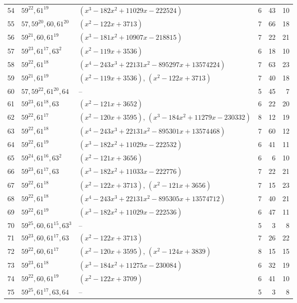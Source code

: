 \documentclass[11pt]{article}
\theoremstyle{definition}
\begin{document}
{\begin{longtable}{rlp{6.2cm}rrr}
54 & $59^{22}, 61^{19}$ & $(x^{3} - 182x^{2} + 11029x - 222524)$ & 6 & 43 & 10 \\
55 & $57, 59^{20}, 60, 61^{20}$ & $(x^{2} - 122x + 3713)$ & 7 & 66 & 18 \\
56 & $59^{21}, 60, 61^{19}$ & $(x^{3} - 181x^{2} + 10907x - 218815)$ & 7 & 22 & 21 \\
57 & $59^{23}, 61^{17}, 63^{2}$ & $(x^{2} - 119x + 3536)$ & 6 & 18 & 10 \\
58 & $59^{22}, 61^{18}$ & $(x^{4} - 243x^{3} + 22131x^{2} - 895297x + 13574224)$ & 7 & 63 & 23 \\
59 & $59^{21}, 61^{19}$ & $(x^{2} - 119x + 3536)$, $(x^{2} - 122x + 3713)$ & 7 & 40 & 18 \\
60 & $57, 59^{22}, 61^{20}, 64$ & -- & 5 & 45 & 7 \\
61 & $59^{23}, 61^{18}, 63$ & $(x^{2} - 121x + 3652)$ & 6 & 22 & 20 \\
62 & $59^{22}, 61^{17}$ & $(x^{2} - 120x + 3595)$, $(x^{3} - 184x^{2} + 11279x - 230332)$ & 8 & 12 & 19 \\
63 & $59^{22}, 61^{18}$ & $(x^{4} - 243x^{3} + 22131x^{2} - 895301x + 13574468)$ & 7 & 60 & 12 \\
64 & $59^{22}, 61^{19}$ & $(x^{3} - 182x^{2} + 11029x - 222532)$ & 6 & 41 & 11 \\
65 & $59^{24}, 61^{16}, 63^{2}$ & $(x^{2} - 121x + 3656)$ & 6 & 6 & 10 \\
66 & $59^{23}, 61^{17}, 63$ & $(x^{3} - 182x^{2} + 11033x - 222776)$ & 7 & 22 & 21 \\
67 & $59^{22}, 61^{18}$ & $(x^{2} - 122x + 3713)$, $(x^{2} - 121x + 3656)$ & 7 & 15 & 23 \\
68 & $59^{22}, 61^{18}$ & $(x^{4} - 243x^{3} + 22131x^{2} - 895305x + 13574712)$ & 7 & 40 & 21 \\
69 & $59^{22}, 61^{19}$ & $(x^{3} - 182x^{2} + 11029x - 222536)$ & 6 & 47 & 11 \\
70 & $59^{25}, 60, 61^{15}, 63^{3}$ & -- & 5 & 3 & 8 \\
71 & $59^{23}, 60, 61^{17}, 63$ & $(x^{2} - 122x + 3713)$ & 7 & 26 & 22 \\
72 & $59^{22}, 60, 61^{17}$ & $(x^{2} - 120x + 3595)$, $(x^{2} - 124x + 3839)$ & 8 & 15 & 15 \\
73 & $59^{23}, 61^{18}$ & $(x^{3} - 184x^{2} + 11275x - 230084)$ & 6 & 32 & 19 \\
74 & $59^{22}, 60, 61^{19}$ & $(x^{2} - 122x + 3709)$ & 6 & 41 & 10 \\
75 & $59^{25}, 61^{17}, 63, 64$ & -- & 5 & 3 & 8 \\

\end{longtable}}
\end{document}
